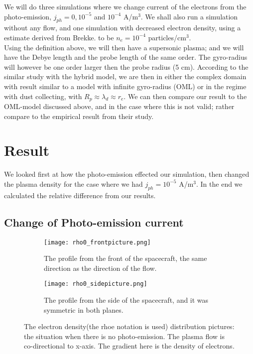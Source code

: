 \documentclass[aip, 
rsi, 
amsmath,
amssymb,
longbibliography,
reprint]{revtex4-1}
\begin{document}
 We will do three simulations where we change current of the electrons from the photo-emission, $j_{ph} = 0, 10^{-5}$ and $10^{-4}$ A/m$^3$. We shall also run a simulation without any flow, and one simulation with decreased electron density, using a estimate derived from Brekke.\cite{Brekke} to be $n_e = 10^{-4}$ particles/cm$^3$.\\
 
Using the definition above, we will then have a supersonic plasma; and we will have the Debye length and the probe length of the same order. The gyro-radius will however be one order larger then the probe radius (5 cm). According to the similar study with the hybrid model\cite{P7}, we are then in either the complex domain with result similar to a model with infinite gyro-radius (OML) or in the regime with dust collecting, with $R_p \approx \lambda_d \approx r_e$. We can then compare our result to the OML-model discussed above, and in the case where this is not valid; rather compare to the empirical result from their study.

\section{Result}

We looked first at how the photo-emission effected our simulation, then changed the plasma density for the case where we had $j_{ph} = 10^{-5}$ A/m$^3$. In the end we calculated the relative difference from our results.

\subsection{Change of Photo-emission current}

\begin{figure*}
\begin{subfigure}{0.45\textwidth}
\texttt{[image: rho0\_frontpicture.png]}
\caption{The profile from the front of the spacecraft, the same direction as the direction of the flow.}
\end{subfigure}
\begin{subfigure}{0.45\textwidth}
\texttt{[image: rho0\_sidepicture.png]}
\caption{The profile from the side of the spacecraft, and it was symmetric in both planes.}
\end{subfigure}
\caption{The electron density(the rhoe notation is used) distribution pictures: the situation when there is no photo-emission. The plasma flow is co-directional to x-axis. The gradient here is the density of electrons.\label{fig:profile_nocurrent}}
\end{figure*}
\end{document}
